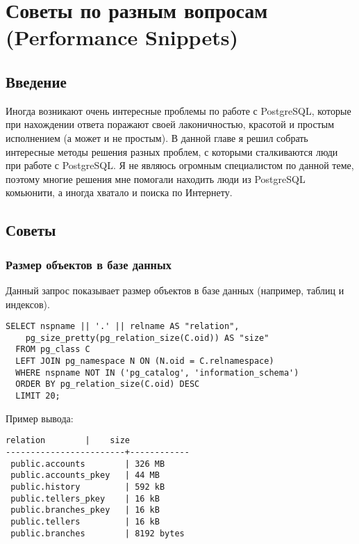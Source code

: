 \chapter{Советы по разным вопросам (Performance Snippets)}
\begin{epigraphs}
\end{epigraphs}

\section{Введение}
Иногда возникают очень интересные проблемы по работе с PostgreSQL, которые при нахождении ответа поражают своей лаконичностью, 
красотой и простым исполнением (а может и не простым). В данной главе я решил собрать интересные методы решения разных проблем, с 
которыми сталкиваются люди при работе с PostgreSQL. Я не являюсь огромным специалистом по данной теме, поэтому многие решения 
мне помогали находить люди из PostgreSQL комьюнити, а иногда хватало и поиска по Интернету. 

\section{Советы}

\subsection{Размер объектов в базе данных}
Данный запрос показывает размер объектов в базе данных (например, таблиц и индексов).

\begin{lstlisting}[label=lst:snippets1,title=snippets/biggest\_relations.sql]
SELECT nspname || '.' || relname AS "relation",
    pg_size_pretty(pg_relation_size(C.oid)) AS "size"
  FROM pg_class C
  LEFT JOIN pg_namespace N ON (N.oid = C.relnamespace)
  WHERE nspname NOT IN ('pg_catalog', 'information_schema')
  ORDER BY pg_relation_size(C.oid) DESC
  LIMIT 20;
\end{lstlisting}

Пример вывода:
\begin{lstlisting}[label=lst:snippets2,caption=Поиск самых больших объектов в БД. Пример вывода]
        relation        |    size    
------------------------+------------
 public.accounts        | 326 MB
 public.accounts_pkey   | 44 MB
 public.history         | 592 kB
 public.tellers_pkey    | 16 kB
 public.branches_pkey   | 16 kB
 public.tellers         | 16 kB
 public.branches        | 8192 bytes
\end{lstlisting}

